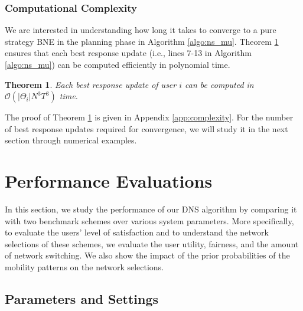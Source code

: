 \documentclass[journal]{IEEEtran}
\newcommand{\mc}[1]{\mathcal{#1}}
\newtheorem{theorem}{Theorem}
\begin{document}
\subsubsection{Computational Complexity}

  We are interested in understanding how long it takes to converge to a pure strategy BNE in the planning phase in Algorithm \ref{algo:ns_mu}. Theorem \ref{thm:complexity} ensures that each best response update (i.e., lines 7-13 in Algorithm \ref{algo:ns_mu}) can be computed efficiently in polynomial time.

\begin{theorem} \label{thm:complexity}
  Each best response update of user $i$ can be computed in $\mc{O}(|\Theta_i| N^3 T^3)$ time.
\end{theorem}

  The proof of Theorem \ref{thm:complexity} is given in Appendix \ref{app:complexity}. 
	For the number of best response updates required for convergence, we will study it in the next section  through numerical examples. %



\section{Performance Evaluations} \label{sec:pe}
 
  In this section, we study the performance of our DNS algorithm by comparing it with two benchmark schemes over various system parameters. 
	More specifically, to evaluate the users' level of satisfaction and to understand the network selections of these schemes, we evaluate the user utility, fairness, and the amount of network switching.
	We also show the impact of the prior probabilities of the mobility patterns on the network selections.


\subsection{Parameters and Settings}
  
\end{document}
